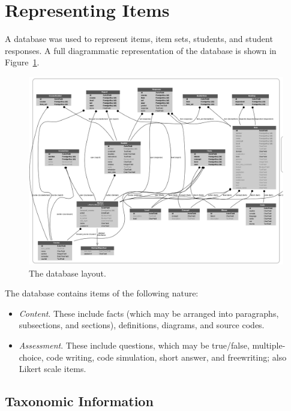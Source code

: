 \section{Representing Items}

A database was used to represent items, item sets, students, and student
responses.  A full diagrammatic representation of the database is shown in
Figure~\ref{fig:database}.

\begin{figure}
 \label{fig:database}
 \includegraphics[width=9in]{fig/database.png} 
 \caption{The database layout.}

\end{figure}

The database contains items of the following nature:

\begin{itemize}

  \item \emph{Content}.  These include facts (which may be arranged into
  paragraphs, subsections, and sections), definitions, diagrams, and source
  codes.

  \item \emph{Assessment}.  These include questions, which may be true/false,
  multiple-choice, code writing, code simulation, short answer, and
  freewriting; also Likert scale items.

\end{itemize}

\subsection{Taxonomic Information}

